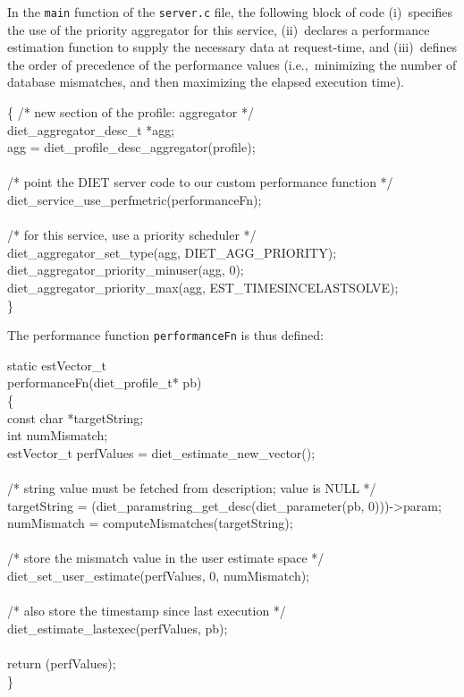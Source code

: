 In the \texttt{main} function of the \texttt{server.c} file, the
following block of code (i)~specifies the use of the priority
aggregator for this service, (ii)~declares a performance estimation
function to supply the necessary data at request-time, and
(iii)~defines the order of precedence of the performance values
(i.e.,~minimizing the number of database mismatches, and then
maximizing the elapsed execution time).
\begin{code}
  \{
    /* new section of the profile: aggregator */ \\
    diet\_aggregator\_desc\_t *agg; \\
    agg = diet\_profile\_desc\_aggregator(profile); \\
\\
    /* point the DIET server code to our custom performance function */ \\
    diet\_service\_use\_perfmetric(performanceFn); \\
\\
    /* for this service, use a priority scheduler */ \\
    diet\_aggregator\_set\_type(agg, DIET\_AGG\_PRIORITY); \\
    diet\_aggregator\_priority\_minuser(agg, 0); \\
    diet\_aggregator\_priority\_max(agg, EST\_TIMESINCELASTSOLVE); \\
  \}
\end{code}
The performance function \texttt{performanceFn} is thus defined:
\begin{code}
static estVector\_t \\
performanceFn(diet\_profile\_t* pb) \\
\{ \\
  const char *targetString; \\
  int numMismatch; \\
  estVector\_t perfValues = diet\_estimate\_new\_vector(); \\
\\
  /* string value must be fetched from description; value is NULL */ \\
  targetString = (diet\_paramstring\_get\_desc(diet\_parameter(pb, 0)))->param; \\
  numMismatch = computeMismatches(targetString); \\
\\
  /* store the mismatch value in the user estimate space */ \\
  diet\_set\_user\_estimate(perfValues, 0, numMismatch); \\
\\
  /* also store the timestamp since last execution */ \\
  diet\_estimate\_lastexec(perfValues, pb); \\
\\
  return (perfValues); \\
\}
\end{code}

